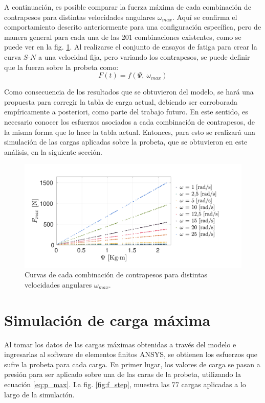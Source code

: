 A continuación, es posible comparar la fuerza máxima de cada combinación de contrapesos para distintas velocidades angulares $\omega_{max}$. Aquí se confirma el comportamiento descrito anteriormente para una configuración específica, pero de manera general para cada una de las 201 combinaciones existentes, como se puede ver en la fig. \ref{fig:fs_psi}. Al realizarse el conjunto de ensayos de fatiga para crear la curva $S$-$N$ a una velocidad fija, pero variando los contrapesos, se puede definir que la fuerza sobre la probeta como:
\begin{equation}\label{eq:func_psiomega}
	F(t) = f(\Psi,\: \omega_{max})
\end{equation}

Como consecuencia de los resultados que se obtuvieron del modelo, se hará una propuesta para corregir la tabla de carga actual, debiendo ser corroborada empíricamente a posteriori, como parte del trabajo futuro. En este sentido, es necesario conocer los esfuerzos asociados a cada combinación de contrapesos, de la misma forma que lo hace la tabla actual. Entonces, para esto se realizará una simulación de las cargas aplicadas sobre la probeta, que se obtuvieron en este análisis, en la siguiente sección. 

\begin{figure}
\centering
\includegraphics[width=1\linewidth, trim={1cm 1cm 4cm 1cm}, clip]{Imagenes/fs_psi2.pdf}
\caption{Curvas de cada combinación de contrapesos para distintas velocidades angulares $\omega_{max}$.}
\label{fig:fs_psi}
\end{figure}

\newpage

\section{Simulación de carga máxima}

Al tomar los datos de las cargas máximas obtenidas a través del modelo e ingresarlas al software de elementos finitos ANSYS, se obtienen los esfuerzos que sufre la probeta para cada carga. En primer lugar, los valores de carga se pasan a presión para ser aplicado sobre una de las caras de la probeta, utilizando la ecuación \ref{eq:p_max}. La fig. \ref{fig:f_step}, muestra las 77 cargas aplicadas a lo largo de la simulación. 

